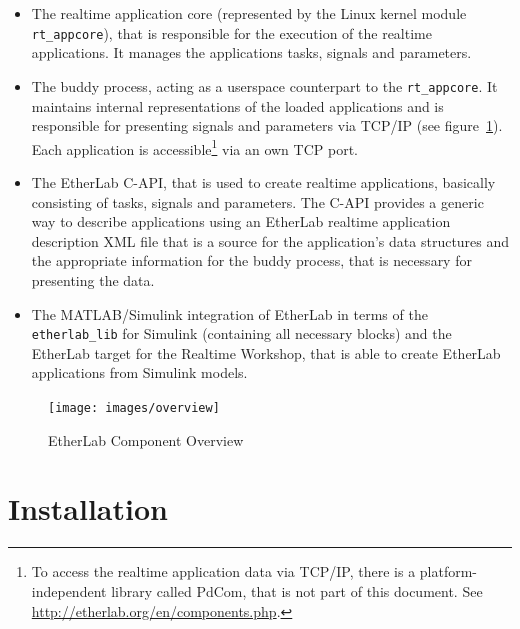 \begin{itemize}

\item The realtime application core (represented by the Linux kernel module
\lstinline+rt_appcore+), that is responsible for the execution of the realtime
applications. It manages the applications tasks, signals and parameters.

\item The buddy process, acting as a userspace counterpart to the
\lstinline+rt_appcore+. It maintains internal representations of the loaded
applications and is responsible for presenting signals and parameters via
TCP/IP (see figure~\ref{fig:overview}). Each application is
accessible\footnote{To access the realtime application data via TCP/IP, there
is a platform-independent library called PdCom, that is not part of this
document. See \url{http://etherlab.org/en/components.php}.} via an own TCP
port.

\item The EtherLab C-API, that is used to create realtime applications,
basically consisting of tasks, signals and parameters. The C-API provides a
generic way to describe applications using an EtherLab realtime application
description XML file that is a source for the application's data structures and
the appropriate information for the buddy process, that is necessary for
presenting the data.

\item The MATLAB/Simulink integration of EtherLab in terms of the
\lstinline+etherlab_lib+ for Simulink (containing all necessary blocks) and the
EtherLab target for the Realtime Workshop, that is able to create EtherLab
applications from Simulink models.

\end{itemize}

\begin{figure}[htb]
  \begin{center}
    \texttt{[image: images/overview]}
    \caption{EtherLab Component Overview}
    \label{fig:overview}
  \end{center}
\end{figure}


\chapter{Installation}
\label{sec:install}

